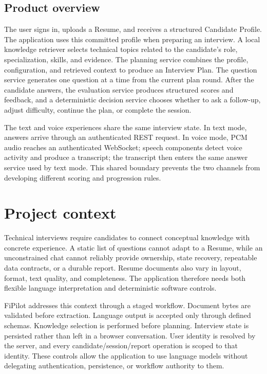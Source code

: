 \subsection{Product overview}

The user signs in, uploads a Resume, and receives a structured Candidate Profile. The application uses this committed profile when preparing an interview. A local knowledge retriever selects technical topics related to the candidate's role, specialization, skills, and evidence. The planning service combines the profile, configuration, and retrieved context to produce an Interview Plan. The question service generates one question at a time from the current plan round. After the candidate answers, the evaluation service produces structured scores and feedback, and a deterministic decision service chooses whether to ask a follow-up, adjust difficulty, continue the plan, or complete the session.

The text and voice experiences share the same interview state. In text mode, answers arrive through an authenticated REST request. In voice mode, PCM audio reaches an authenticated WebSocket; speech components detect voice activity and produce a transcript; the transcript then enters the same answer service used by text mode. This shared boundary prevents the two channels from developing different scoring and progression rules.


\section{Project context}

Technical interviews require candidates to connect conceptual knowledge with concrete experience. A static list of questions cannot adapt to a Resume, while an unconstrained chat cannot reliably provide ownership, state recovery, repeatable data contracts, or a durable report. Resume documents also vary in layout, format, text quality, and completeness. The application therefore needs both flexible language interpretation and deterministic software controls.

FiPilot addresses this context through a staged workflow. Document bytes are validated before extraction. Language output is accepted only through defined schemas. Knowledge selection is performed before planning. Interview state is persisted rather than left in a browser conversation. User identity is resolved by the server, and every candidate/session/report operation is scoped to that identity. These controls allow the application to use language models without delegating authentication, persistence, or workflow authority to them.

